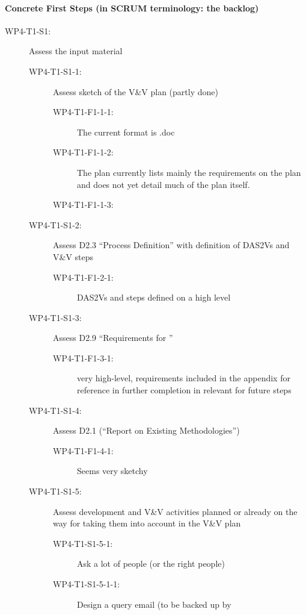 \documentclass{template/openetcs_report}
\begin{document}
{\it
\paragraph{Concrete First Steps (in SCRUM terminology: the backlog)}
\label{sec:concrete-first-steps}
\begin{description}
\item[WP4-T1-S1:] Assess the input material
  \begin{description}
  \item[WP4-T1-S1-1:] Assess sketch of the V\&V plan (partly done)
    \begin{description}
    \item[WP4-T1-F1-1-1:] The current format is .doc
    \item[WP4-T1-F1-1-2:] The plan currently lists mainly the requirements
      on the plan and does not yet detail much of the plan itself.
    \item[WP4-T1-F1-1-3:] 
    \end{description}
  \item[WP4-T1-S1-2:] Assess D2.3 ``Process Definition'' with
    definition of DAS2Vs and V\&V steps
    \begin{description}
    \item[WP4-T1-F1-2-1:] DAS2Vs and \vv steps defined on a high level
    \end{description}
  \item[WP4-T1-S1-3:] Assess D2.9 ``Requirements for \VV''
    \begin{description}
    \item[WP4-T1-F1-3-1:] very high-level, requirements included in
      the appendix for reference in further completion in relevant for
      future steps  
    \end{description}
  \item[WP4-T1-S1-4:] Assess D2.1 (``Report on Existing Methodologies'')
    \begin{description}
    \item[WP4-T1-F1-4-1:] Seems very sketchy
    \end{description}
  \item[WP4-T1-S1-5:] Assess development and V\&V activities planned or
    already on the way for taking them into account in the V\&V plan 
    \begin{description}
    \item[WP4-T1-S1-5-1:] Ask a lot of people (or the right people)
    \item[WP4-T1-S1-5-1-1:] Design a query email (to be backed up by

\end{description}
\end{description}
\end{description}}
\end{document}
